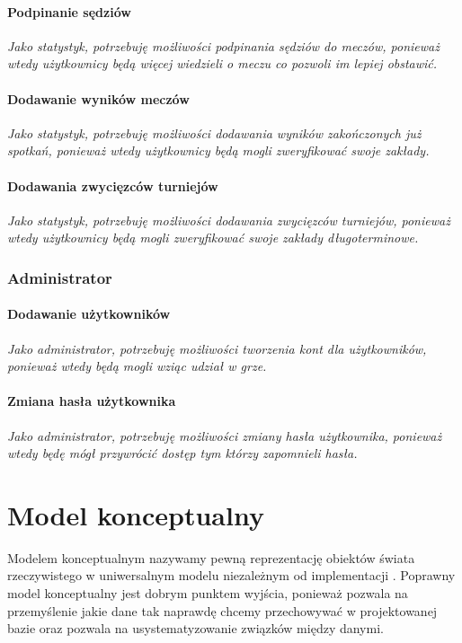 \documentclass{mwrep}[15pt]
\begin{document}
\subsubsection{Podpinanie sędziów}
\emph{Jako statystyk, potrzebuję możliwości podpinania sędziów do meczów, ponieważ wtedy użytkownicy będą więcej wiedzieli o meczu co pozwoli im lepiej obstawić.}

\subsubsection{Dodawanie wyników meczów}
\emph{Jako statystyk, potrzebuję możliwości dodawania wyników zakończonych już spotkań, ponieważ wtedy użytkownicy będą mogli zweryfikować swoje zakłady.}

\subsubsection{Dodawania zwycięzców turniejów}
\emph{Jako statystyk, potrzebuję możliwości dodawania zwycięzców turniejów, ponieważ wtedy użytkownicy będą mogli zweryfikować swoje zakłady długoterminowe.}


\subsection{Administrator}
\subsubsection{Dodawanie użytkowników}
\emph{Jako administrator, potrzebuję możliwości tworzenia kont dla użytkowników, ponieważ wtedy będą mogli wziąc udział w grze.}

\subsubsection{Zmiana hasła użytkownika}
\emph{Jako administrator, potrzebuję możliwości zmiany hasła użytkownika, ponieważ wtedy będę mógł przywrócić dostęp tym którzy zapomnieli hasła.}


\chapter{Model konceptualny}
Modelem konceptualnym nazywamy pewną reprezentację obiektów świata rzeczywistego 
w uniwersalnym modelu niezależnym od implementacji \cite{Wrembel1}. Poprawny model 
konceptualny jest dobrym punktem wyjścia, ponieważ pozwala na przemyślenie jakie
dane tak naprawdę chcemy przechowywać w projektowanej bazie oraz pozwala na usystematyzowanie
związków między danymi.
\end{document}
